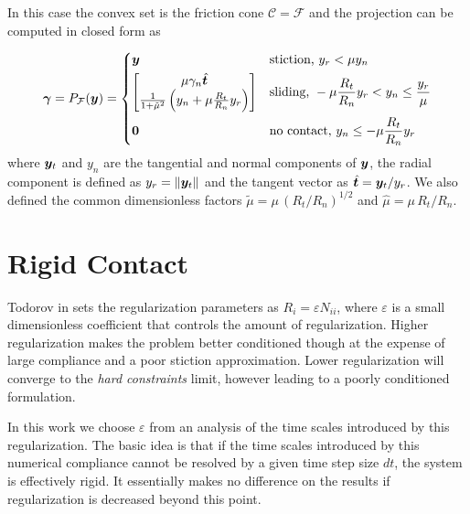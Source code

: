 In this case the convex set is the friction cone $\mathcal{C} = \mathcal{F}$ and
the projection can be computed in closed form as

\begin{equation}
	\bgamma = P_\mathcal{F}(\vf{y}) = 
\begin{dcases}
	\vf{y} 
	& \text{stiction, } y_r < \mu y_n\\
	\begin{bmatrix}
		\mu\gamma_n\hat{\vf{t}}\\
		\frac{1}{1+\tilde\mu^2}\left(y_n +
	\mu\frac{R_t}{R_n}y_r\right)
	\end{bmatrix}
	& \text{sliding, } -\mu \frac{R_t}{R_n} y_r < y_n \leq \frac{y_r}{\mu}\\
    \vf{0} & \text{no contact, } y_n \leq -\mu \frac{R_t}{R_n} y_r
\end{dcases}	  
	\label{eq:contact_projection}
\end{equation}
where ${\bm{y}}_t$ and $y_n$ are the tangential and normal components of ${\bm{y}}$,
the radial component is defined as $y_r=\Vert{\bm{y}}_t\Vert$ and the tangent
vector as $\hat{{\bm{t}}}={\bm{y}}_t/y_r$. We also defined the common dimensionless
factors $\tilde\mu=\mu\,(R_t/R_n)^{1/2}$ and $\hat\mu=\mu\,R_t/R_n$.


\section{Rigid Contact}

Todorov in \cite{bib:todorov2014} sets the regularization parameters as
$R_i=\varepsilon N_{ii}$, where $\varepsilon$ is a small dimensionless
coefficient that controls the amount of regularization. Higher regularization
makes the problem better conditioned though at the expense of large compliance
and a poor stiction approximation. Lower regularization will converge to the
\textit{hard constraints} limit, however leading to a poorly conditioned
formulation. 

In this work we choose $\varepsilon$ from an analysis of the time scales
introduced by this regularization. The basic idea is that if the time scales
introduced by this numerical compliance cannot be resolved by a given time step
size $dt$, the system is effectively rigid. It essentially makes no difference
on the results if regularization is decreased beyond this point. 

